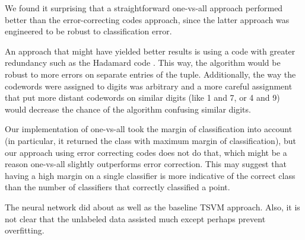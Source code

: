 \documentclass[11pt]{article}
\begin{document}
We found it surprising that a straightforward one-vs-all
approach performed better than the error-correcting codes approach,
since the latter approach was engineered to be robust to classification
error.

An approach that might have yielded better results is
using a code with greater redundancy such as the Hadamard
code \cite{macwilliams1977theory}.
This way, the algorithm would be robust to more errors on separate entries
of the tuple.
Additionally, the way the codewords were assigned to digits was arbitrary
and a more careful assignment that put more distant codewords on
similar digits (like 1 and 7, or 4 and 9) would decrease the chance
of the algorithm confusing similar digits.

Our implementation of one-vs-all took the margin of classification
into account (in particular, it returned the class with maximum margin of
classification), but our approach using error correcting codes does not do that,
which might be a reason one-vs-all slightly 
outperforms error correction. This may suggest that having a high margin
on a single classifier is more indicative of the correct class than
the number of classifiers that correctly classified a point.

The neural network did about as well as the baseline TSVM approach. Also, it is not clear that the unlabeled data assisted much except perhaps prevent overfitting.
\end{document}
